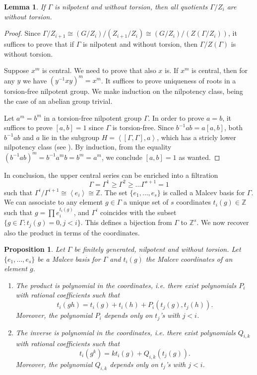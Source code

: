 \documentclass{amsart}
\newtheorem{prop}[thm]{Proposition}
\newtheorem{lemma}[thm]{Lemma}
\theoremstyle{definition}
\theoremstyle{remark}
\theoremstyle{remark}
\newcommand{\Z}{\mathbb{Z}}
\begin{document}
\begin{lemma}
If $\Gamma$ is nilpotent and without torsion, then all quotients $\Gamma/Z_i$ are without torsion.
\end{lemma}

\begin{proof}
Since $\Gamma/Z_{i+1}\cong({G/Z_i})/({Z_{i+1}/Z_i})\cong({G/Z_i})/({Z(\Gamma/Z_i)})$, it suffices to prove that if $\Gamma$ is nilpotent and without torsion, then $\Gamma/Z(\Gamma)$ is without torsion. 

Suppose $x^m$ is central. We need to prove that also $x$ is. If $x^m$ is central, then for any $y$ we have $(y^{-1}xy)^m=x^m$. It suffices to prove uniqueness of roots in a torsion-free nilpotent group. We make induction on the nilpotency class, being the case of an abelian group trivial.

Let $a^m=b^m$ in a torsion-free nilpotent group $\Gamma$. In order to prove $a=b$, it suffices to prove $[a,b]=1$ since $\Gamma$ is torsion-free. Since $b^{-1}ab=a[a,b]$, both $b^{-1}ab$ and $a$ lie in the subgroup $H=\left\langle [\Gamma,\Gamma],a\right\rangle$, which has a stricly lower nilpotency class (see \cite[Proposition 2.5.5]{suisse}). By induction, from the equality $(b^{-1}ab)^m=b^{-1}a^mb=b^m=a^m$, we conclude $[a,b]=1$ as wanted.
\end{proof}

In conclusion, the upper central series can be enriched into a filtration 
\[
\Gamma=\Gamma^1\geq\Gamma^2\geq\ldots\Gamma^{s+1}=1
\]
such that $\Gamma^i/\Gamma^{i+1}\cong\left\langle e_i\right\rangle\cong\Z$. The set $\{e_1,\ldots,e_s\}$ is called a Malcev basis for $\Gamma$. We can associate to any element $g\in\Gamma$ a unique set of $s$ coordinates $t_i(g)\in\Z$ such that $g=\prod e_i^{t_i(g)}$, and $\Gamma^i$ coincides with the subset $\{g\in\Gamma\colon t_j(g)=0, j<i\}$. This defines a bijection from $\Gamma$ to $\Z^s$. We now recover also the product in terms of the coordinates.

\begin{prop}
Let $\Gamma$ be finitely generated, nilpotent and without torsion. Let $\{e_1,\ldots,e_s\}$ be a Malcev basis for $\Gamma$ and $t_i(g)$ the Malcev coordinates of an element $g$.
\begin{enumerate}
	\item The product is polynomial in the coordinates, i.e. there exist polynomials $P_{i}$ with rational coefficients such that
	\[t_i(gh)=t_i(g)+t_i(h)+P_{i}(t_j(g),t_j(h)).\]
	Moreover, the polynomial $P_{i}$ depends only on $t_j$'s with $j<i$.
	\item The inverse is polynomial in the coordinates, i.e. there exist polynomials $Q_{i,k}$ with rational coefficients such that
	\[t_i(g^k)=kt_i(g)+Q_{i,k}(t_j(g)).\]
	Moreover, the polynomial $Q_{i,k}$ depends only on $t_j$'s with $j<i$.
\end{enumerate}
\end{prop}
\end{document}
